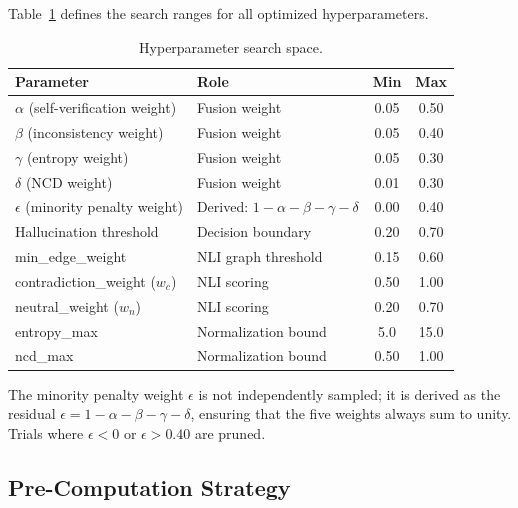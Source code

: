 Table~\ref{tab:search-space} defines the search ranges for all optimized hyperparameters.

\begin{table}[!htbp]
    \centering
    \caption{Hyperparameter search space.}
    \label{tab:search-space}
    \begin{tabular}{llcc}
        \toprule
        \textbf{Parameter} & \textbf{Role} & \textbf{Min} & \textbf{Max} \\
        \midrule
        $\alpha$ (self-verification weight)    & Fusion weight  & 0.05 & 0.50 \\
        $\beta$ (inconsistency weight)         & Fusion weight  & 0.05 & 0.40 \\
        $\gamma$ (entropy weight)              & Fusion weight  & 0.05 & 0.30 \\
        $\delta$ (NCD weight)                  & Fusion weight  & 0.01 & 0.30 \\
        $\epsilon$ (minority penalty weight)   & Derived: $1 - \alpha - \beta - \gamma - \delta$ & 0.00 & 0.40 \\
        Hallucination threshold                & Decision boundary & 0.20 & 0.70 \\
        min\_edge\_weight                      & NLI graph threshold & 0.15 & 0.60 \\
        contradiction\_weight ($w_c$)          & NLI scoring & 0.50 & 1.00 \\
        neutral\_weight ($w_n$)                & NLI scoring & 0.20 & 0.70 \\
        entropy\_max                           & Normalization bound & 5.0 & 15.0 \\
        ncd\_max                               & Normalization bound & 0.50 & 1.00 \\
        \bottomrule
    \end{tabular}
\end{table}

The minority penalty weight $\epsilon$ is not independently sampled; it is derived as the residual $\epsilon = 1 - \alpha - \beta - \gamma - \delta$, ensuring that the five weights always sum to unity. Trials where $\epsilon < 0$ or $\epsilon > 0.40$ are pruned.

\subsection{Pre-Computation Strategy}
\label{sec:precompute}


